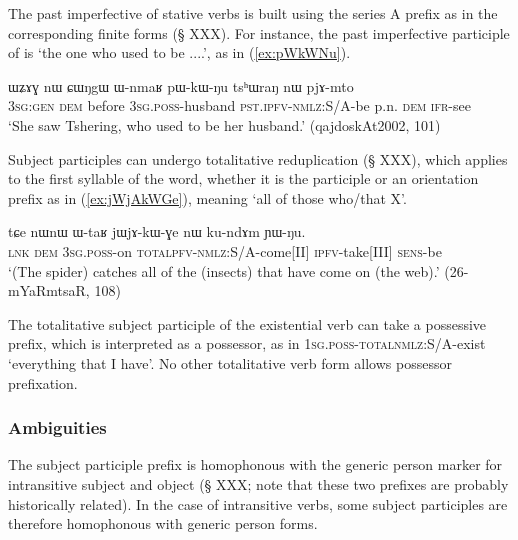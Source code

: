 The past imperfective of stative verbs is built using the series A prefix  as in the corresponding finite forms (§ XXX). For instance, the past imperfective participle of  is  `the one who used to be ....', as in (\ref{ex:pWkWNu}).

\begin{exe}
\ex \label{ex:pWkWNu}
 \gll  ɯʑɤɣ nɯ ɕɯŋgɯ ɯ-nmaʁ pɯ-kɯ-ŋu tsʰɯraŋ nɯ pjɤ-mto \\
 \textsc{3sg}:\textsc{gen} \textsc{dem} before \textsc{3sg}.\textsc{poss}-husband \textsc{pst}.\textsc{ipfv}-\textsc{nmlz}:S/A-be p.n. \textsc{dem} \textsc{ifr}-see \\
\glt `She saw Tshering, who used to be her husband.' (qajdoskAt2002, 101)
\end{exe}

Subject participles can undergo totalitative reduplication (§ XXX), which applies to the first syllable of the word, whether it is the participle  or an orientation prefix as in (\ref{ex:jWjAkWGe}), meaning `all of those who/that X'.

\begin{exe}
\ex \label{ex:jWjAkWGe}
\gll tɕe nɯnɯ ɯ-taʁ jɯ\redp{}jɤ-kɯ-ɣe nɯ ku-ndɤm ɲɯ-ŋu. \\
\textsc{lnk} \textsc{dem} \textsc{3sg}.\textsc{poss}-on \textsc{total}\redp{}\textsc{pfv}-\textsc{nmlz}:S/A-come[II] \textsc{ipfv}-take[III] \textsc{sens}-be \\
\glt `(The spider) catches all of the (insects) that have come on (the web).' (26-mYaRmtsaR, 108)
\end{exe}

The totalitative subject participle of the existential verb  can take a possessive prefix, which is interpreted as a possessor, as in  \textsc{1sg}.\textsc{poss}-\textsc{total}\redp{}\textsc{nmlz}:S/A-exist `everything that I have'. No other totalitative verb form allows possessor prefixation.

\subsubsection{Ambiguities}  \label{ex:subject.participle.ambiguities}
The subject participle  prefix is homophonous with the generic person marker for intransitive subject and object (§ XXX; note that these two prefixes are probably historically related). In the case of intransitive verbs, some subject participles are therefore homophonous with generic person forms. 

